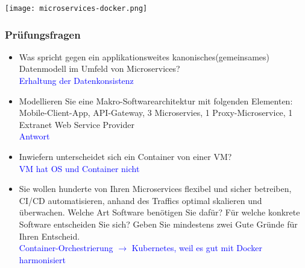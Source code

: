 \texttt{[image: microservices-docker.png]}

\columnbreak
\subsubsection{Prüfungsfragen}

\begin{itemize}
    \item Was spricht gegen ein applikationsweites kanonisches(gemeinsames) Datenmodell im Umfeld von Microservices? \\
    \textcolor{blue}{Erhaltung der Datenkonsistenz}
    \item Modellieren Sie eine Makro-Softwarearchitektur mit folgenden Elementen: Mobile-Client-App, API-Gateway, 3 Microservies, 1 Proxy-Microservice, 1 Extranet Web Service Provider \\
    \textcolor{blue}{Antwort}
    \item Inwiefern unterscheidet sich ein Container von einer VM? \\
    \textcolor{blue}{VM hat OS und Container nicht}
    \item Sie wollen hunderte von Ihren Microservices flexibel und sicher betreiben, CI/CD automatisieren, anhand des Traffics optimal skalieren und überwachen. Welche Art Software benötigen Sie dafür? Für welche konkrete Software entscheiden Sie sich? Geben Sie mindestens zwei Gute Gründe für Ihren Entscheid. \\
    \textcolor{blue}{Container-Orchestrierung $\rightarrow$ Kubernetes, weil es gut mit Docker harmonisiert}
\end{itemize}


